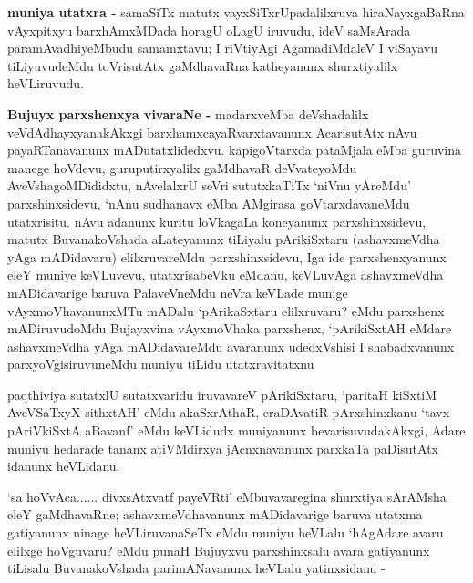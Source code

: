 \begin{artha}
{\bf muniya utatxra -} samaSiTx matutx vayxSiTxrUpadalilxruva hiraNayxgaBaRna vAyxpitxyu barxhAmxMDada horagU oLagU iruvudu, ideV saMsArada paramAvadhiyeMbudu samamxtavu; I riVtiyAgi AgamadiMdaleV I viSayavu tiLiyuvudeMdu toVrisutAtx gaMdhavaRna katheyanunx shurxtiyalilx heVLiruvudu.
\end{artha}

\begin{artha}
{\bf Bujuyx parxshenxya vivaraNe -} madarxveMba deVshadalilx veVdAdhayxyanakAkxgi barxhamxcayaRvarxtavanunx AcarisutAtx nAvu payaRTanavanunx mADutatxlidedxvu. kapigoVtarxda pataMjala eMba guruvina manege hoVdevu, guruputirxyalilx gaMdhavaR deVvateyoMdu AveVshagoMDididxtu, nAvelalxrU seVri sututxkaTiTx `niVnu yAreMdu' parxshinxsidevu, `nAnu sudhanavx eMba AMgirasa goVtarxdavaneMdu utatxrisitu. nAvu adanunx kuritu loVkagaLa koneyanunx parxshinxsidevu, matutx BuvanakoVshada aLateyanunx tiLiyalu pArikiSxtaru (ashavxmeVdha yAga mADidavaru) elilxruvareMdu parxshinxsidevu, Iga ide parxshenxyanunx eleY muniye keVLuvevu, utatxrisabeVku eMdanu, keVLuvAga ashavxmeVdha mADidavarige baruva PalaveVneMdu neVra keVLade munige vAyxmoVhavanunxMTu mADalu `pArikaSxtaru elilxruvaru? eMdu parxshenx mADiruvudoMdu Bujayxvina vAyxmoVhaka parxshenx, `pArikiSxtAH eMdare ashavxmeVdha yAga mADidavareMdu avaranunx udedxVshisi I shabadxvanunx parxyoVgisiruvuneMdu muniyu tiLidu utatxravitatxnu \mdash 
\end{artha}

\begin{artha}
paqthiviya sutatxlU sutatxvaridu iruvavareV pArikiSxtaru, `paritaH kiSxtiM AveVSaTxyX sithxtAH' eMdu akaSxrAthaR, eraDAvatiR pArxshinxkanu `tavx pAriVkiSxtA aBavanf' eMdu keVLidudx muniyanunx bevarisuvudakAkxgi, Adare muniyu hedarade tananx atiVMdirxya jAcnxnavanunx parxkaTa paDisutAtx idanunx heVLidanu.
\end{artha}

\begin{artha}
`sa hoVvAca...... divxsAtxvatf payeVRti' eMbuvavaregina shurxtiya sArAMsha \mdash  eleY gaMdhavaRne; ashavxmeVdhavanunx mADidavarige baruva utatxma gatiyanunx ninage heVLiruvanaSeTx eMdu muniyu heVLalu `hAgAdare avaru elilxge hoVguvaru? eMdu punaH Bujuyxvu parxshinxsalu avara gatiyanunx tiLisalu BuvanakoVshada parimANavanunx heVLalu yatinxsidanu - 
\end{artha}

